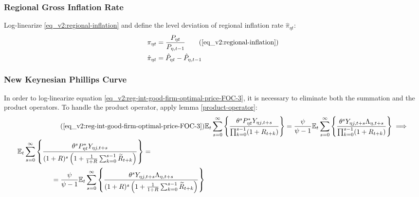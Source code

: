 \documentclass[../thesis.tex]{subfiles}
\begin{document}
		
	\subsubsection*{Regional Gross Inflation Rate}

	Log-linearize \ref{eq_v2:regional-inflation} and define the level deviation of regional inflation rate $\hat{\pi}_{\eta t}$:
	\begin{align}
		\pi_{\eta t} &= \frac{P_{\eta t}}{P_{\eta, t-1}} \tag{\ref{eq_v2:regional-inflation}} \\
		\hat{\pi}_{\eta t} &= \hat{P}_{\eta t} - \hat{P}_{\eta, t-1}
		\label{eq_v2:level-dev-regional-inflation}
	\end{align}


\subsubsection*{New Keynesian Phillips Curve}

In order to log-linearize equation \ref{eq_v2:reg-int-good-firm-optimal-price-FOC-3}, it is necessary to eliminate both the summation and the product operators. To handle the product operator, apply lemma \ref{product-operator}:
\begin{align}
	\tag{\ref{eq_v2:reg-int-good-firm-optimal-price-FOC-3}}
	& \E \sum_{s=0}^{\infty} \left\{ \frac{\theta^s P_{\eta t}^{\ast} Y_{\eta j,t+s}}{ \prod_{k=0}^{s-1}(1+R_{t+k})} \right\} = \frac{\psi}{\psi-1} \E \sum_{s=0}^{\infty} \left\{ \frac{\theta^s Y_{\eta j,t+s} \Lambda_{\eta, t+s}}{\prod_{k=0}^{s-1}(1+R_{t+k})} \right\} \implies
	\\
	\begin{split}
		& \E \sum_{s=0}^{\infty} \left\{ \frac{\theta^s P_{\eta t}^{\ast} Y_{\eta j,t+s}}{ (1 + R)^s \left( 1 + \frac{1}{1 + R} \sum_{k=0}^{s-1} \widetilde{R}_{t+k} \right)} \right\} = 
		\\ & \quad \quad \quad \quad \quad = \frac{\psi}{\psi-1} \E \sum_{s=0}^{\infty} \left\{ \frac{\theta^s Y_{\eta j,t+s} \Lambda_{\eta, t+s}}{ (1 + R)^s \left( 1 + \frac{1}{1 + R} \sum_{k=0}^{s-1} \widetilde{R}_{t+k} \right)} \right\} \label{eq_v2:reg-ll-optimal-price}
	\end{split}
\end{align}
\end{document}
